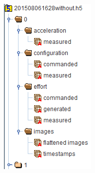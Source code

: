\documentclass{beamer}
\begin{document}
\begin{frame}
\begin{columns}[onlytextwidth]
\begin{column}{.4\textwidth}
\begin{figure}
                    \includegraphics[width=.7\columnwidth]{figs/h5}
                \end{figure}
            \end{column}
        \end{columns}
    \end{frame}
\end{document}
